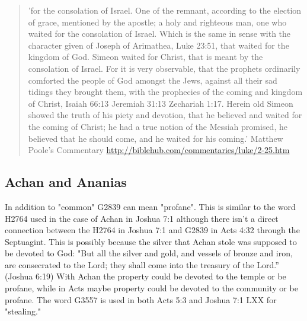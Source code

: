 \documentclass[11pt]{article}
\begin{document}
\begin{quote}
'for the consolation of Israel. One of the remnant, according to the election of grace, mentioned by the apostle; a holy and righteous man, one who waited for the consolation of Israel. Which is the same in sense with the character given of Joseph of Arimathea, Luke 23:51, that waited for the kingdom of God. Simeon waited for Christ, that is meant by the consolation of Israel. For it is very observable, that the prophets ordinarily comforted the people of God amongst the Jews, against all their sad tidings they brought them, with the prophecies of the coming and kingdom of Christ, Isaiah 66:13 Jeremiah 31:13 Zechariah 1:17. Herein old Simeon showed the truth of his piety and devotion, that he believed and waited for the coming of Christ; he had a true notion of the Messiah promised, he believed that he should come, and he waited for his coming.'\newline
Matthew Poole's Commentary
\url{http://biblehub.com/commentaries/luke/2-25.htm}
\end{quote}

\subsection{Achan and Ananias}
In addition to "common" G2839 can mean "profane".\cite{common faith} This is similar to the word H2764 used in the case of Achan in Joshua 7:1\cite{H2764 H2763} although there isn't a direct connection between the H2764 in Joshua 7:1 and G2839 in Acts 4:32 through the Septuagint.
This is possibly because the silver that Achan stole was supposed to be devoted to God: "But all the silver and gold, and vessels of bronze and iron, are consecrated to the Lord; they shall come into the treasury of the Lord.” (Joshua 6:19)
 With Achan the property could be devoted to the temple or be profane, while in Acts maybe property could be devoted to the community or be profane. The word G3557 is used in both Acts 5:3 and Joshua 7:1 LXX for "stealing." 
\end{document}
